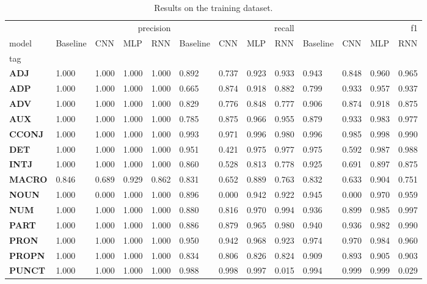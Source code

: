 \begin{table}
\caption{Results on the training dataset.}
\label{tab::ex_2_train}
\begin{tabular}{|l||l||l||l||l||l||l||l||l||l||l||l||l|}
\toprule
 & \multicolumn{4}{r}{precision} & \multicolumn{4}{r}{recall} & \multicolumn{4}{r}{f1} \\
model & Baseline & CNN & MLP & RNN & Baseline & CNN & MLP & RNN & Baseline & CNN & MLP & RNN \\
tag &  &  &  &  &  &  &  &  &  &  &  &  \\
\midrule
\textbf{ADJ} & 1.000 & 1.000 & 1.000 & 1.000 & 0.892 & 0.737 & 0.923 & 0.933 & 0.943 & 0.848 & 0.960 & 0.965 \\
\textbf{ADP} & 1.000 & 1.000 & 1.000 & 1.000 & 0.665 & 0.874 & 0.918 & 0.882 & 0.799 & 0.933 & 0.957 & 0.937 \\
\textbf{ADV} & 1.000 & 1.000 & 1.000 & 1.000 & 0.829 & 0.776 & 0.848 & 0.777 & 0.906 & 0.874 & 0.918 & 0.875 \\
\textbf{AUX} & 1.000 & 1.000 & 1.000 & 1.000 & 0.785 & 0.875 & 0.966 & 0.955 & 0.879 & 0.933 & 0.983 & 0.977 \\
\textbf{CCONJ} & 1.000 & 1.000 & 1.000 & 1.000 & 0.993 & 0.971 & 0.996 & 0.980 & 0.996 & 0.985 & 0.998 & 0.990 \\
\textbf{DET} & 1.000 & 1.000 & 1.000 & 1.000 & 0.951 & 0.421 & 0.975 & 0.977 & 0.975 & 0.592 & 0.987 & 0.988 \\
\textbf{INTJ} & 1.000 & 1.000 & 1.000 & 1.000 & 0.860 & 0.528 & 0.813 & 0.778 & 0.925 & 0.691 & 0.897 & 0.875 \\
\textbf{MACRO} & 0.846 & 0.689 & 0.929 & 0.862 & 0.831 & 0.652 & 0.889 & 0.763 & 0.832 & 0.633 & 0.904 & 0.751 \\
\textbf{NOUN} & 1.000 & 0.000 & 1.000 & 1.000 & 0.896 & 0.000 & 0.942 & 0.922 & 0.945 & 0.000 & 0.970 & 0.959 \\
\textbf{NUM} & 1.000 & 1.000 & 1.000 & 1.000 & 0.880 & 0.816 & 0.970 & 0.994 & 0.936 & 0.899 & 0.985 & 0.997 \\
\textbf{PART} & 1.000 & 1.000 & 1.000 & 1.000 & 0.886 & 0.879 & 0.965 & 0.980 & 0.940 & 0.936 & 0.982 & 0.990 \\
\textbf{PRON} & 1.000 & 1.000 & 1.000 & 1.000 & 0.950 & 0.942 & 0.968 & 0.923 & 0.974 & 0.970 & 0.984 & 0.960 \\
\textbf{PROPN} & 1.000 & 1.000 & 1.000 & 1.000 & 0.834 & 0.806 & 0.826 & 0.824 & 0.909 & 0.893 & 0.905 & 0.903 \\
\textbf{PUNCT} & 1.000 & 1.000 & 1.000 & 1.000 & 0.988 & 0.998 & 0.997 & 0.015 & 0.994 & 0.999 & 0.999 & 0.029 \\

\end{tabular}
\end{table}
